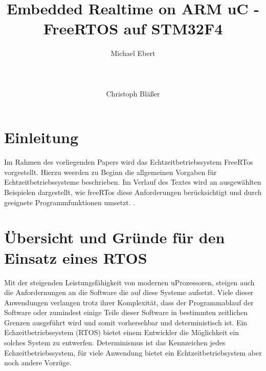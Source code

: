 \documentclass[ngerman]{seminarvorlage}
\begin{document}
\title{Embedded Realtime on ARM uC - FreeRTOS auf STM32F4}
\author{
  \alignauthor Michael Ebert\\
    \\
		\\
    \\
  \alignauthor Christoph Bläßer\\
}

\maketitle



\section{Einleitung}

Im Rahmen des vorliegenden Papers wird das Echtzeitbetriebssystem FreeRTos vorgestellt. Hierzu weerden zu Beginn die allgemeinen Vorgaben für Echtzeitbetriebssysteme beschrieben. Im Verlauf des Textes wird an ausgewählten Beispielen dargestellt, wie freeRTos diese Anforderungen berücksichtigt und durch geeignete Programmfunktionen umsetzt. \cite{acmcategories,Ivory2001}.

\section{Übersicht und Gründe für den Einsatz eines RTOS}
Mit der steigenden Leistungsfähigkeit von modernen uProzessoren, steigen auch die Anfordernungen an die Software die auf diese Systeme aufsetzt.
Viele dieser Anwendungen verlangen trotz ihrer Komplexität, dass der Programmablauf der Software oder zumindest einige Teile dieser Software in bestimmten zeitlichen Grenzen ausgeführt wird und somit vorhersehbar und deterministisch ist. Ein Echzeitbetriebssystem (RTOS) bietet einem Entwickler die Möglichkeit ein solches System zu entwerfen. Determinismus ist das Kennzeichen jedes Echzeitbetriebssystem, für viele Anwendung bietet ein Echtzeitbetriebsystem aber noch andere Vorzüge. 
\end{document}
